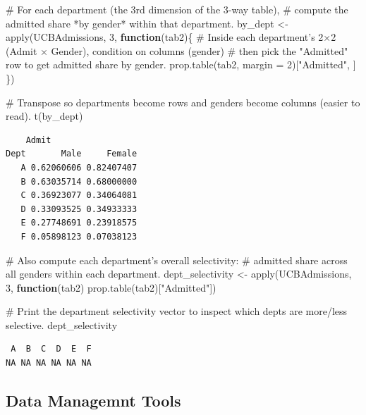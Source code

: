 \documentclass[
  letterpaper,
  DIV=11,
  numbers=noendperiod]{scrreprt}
\newenvironment{Shaded}{\begin{snugshade}}{\end{snugshade}}
\newcommand{\AttributeTok}[1]{\textcolor[rgb]{0.40,0.45,0.13}{#1}}
\newcommand{\CommentTok}[1]{\textcolor[rgb]{0.37,0.37,0.37}{#1}}
\newcommand{\ControlFlowTok}[1]{\textcolor[rgb]{0.00,0.23,0.31}{\textbf{#1}}}
\newcommand{\DecValTok}[1]{\textcolor[rgb]{0.68,0.00,0.00}{#1}}
\newcommand{\FunctionTok}[1]{\textcolor[rgb]{0.28,0.35,0.67}{#1}}
\newcommand{\NormalTok}[1]{\textcolor[rgb]{0.00,0.23,0.31}{#1}}
\newcommand{\OtherTok}[1]{\textcolor[rgb]{0.00,0.23,0.31}{#1}}
\newcommand{\StringTok}[1]{\textcolor[rgb]{0.13,0.47,0.30}{#1}}
\begin{document}
\begin{Shaded}
\begin{Highlighting}[]
\CommentTok{\# For each department (the 3rd dimension of the 3{-}way table),}
\CommentTok{\# compute the admitted share *by gender* within that department.}
\NormalTok{by\_dept }\OtherTok{\textless{}{-}} \FunctionTok{apply}\NormalTok{(UCBAdmissions, }\DecValTok{3}\NormalTok{, }\ControlFlowTok{function}\NormalTok{(tab2)\{}
  \CommentTok{\# Inside each department’s 2×2 (Admit × Gender), condition on columns (gender)}
  \CommentTok{\# then pick the "Admitted" row to get admitted share by gender.}
  \FunctionTok{prop.table}\NormalTok{(tab2, }\AttributeTok{margin =} \DecValTok{2}\NormalTok{)[}\StringTok{"Admitted"}\NormalTok{, ]}
\NormalTok{\})}

\CommentTok{\# Transpose so departments become rows and genders become columns (easier to read).}
\FunctionTok{t}\NormalTok{(by\_dept)}
\end{Highlighting}
\end{Shaded}

\begin{verbatim}
    Admit
Dept       Male     Female
   A 0.62060606 0.82407407
   B 0.63035714 0.68000000
   C 0.36923077 0.34064081
   D 0.33093525 0.34933333
   E 0.27748691 0.23918575
   F 0.05898123 0.07038123
\end{verbatim}

\begin{Shaded}
\begin{Highlighting}[]
\CommentTok{\# Also compute each department’s overall selectivity:}
\CommentTok{\# admitted share across all genders within each department.}
\NormalTok{dept\_selectivity }\OtherTok{\textless{}{-}} \FunctionTok{apply}\NormalTok{(UCBAdmissions, }\DecValTok{3}\NormalTok{, }\ControlFlowTok{function}\NormalTok{(tab2) }\FunctionTok{prop.table}\NormalTok{(tab2)[}\StringTok{"Admitted"}\NormalTok{])}

\CommentTok{\# Print the department selectivity vector to inspect which depts are more/less selective.}
\NormalTok{dept\_selectivity}
\end{Highlighting}
\end{Shaded}

\begin{verbatim}
 A  B  C  D  E  F 
NA NA NA NA NA NA 
\end{verbatim}

\subsection{Data Managemnt Tools}\label{data-managemnt-tools}
\end{document}

